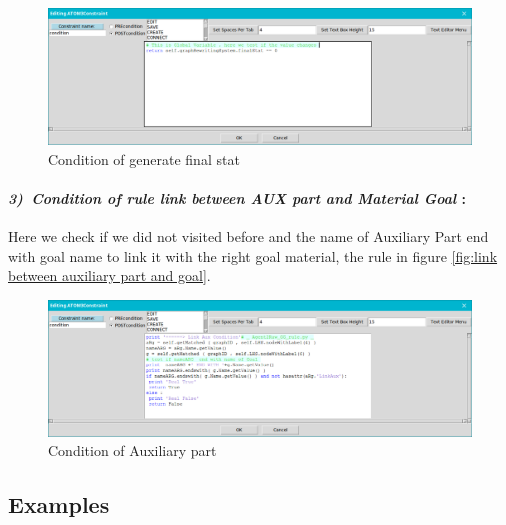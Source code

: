  
\vspace{1cm}
\begin{figure}[th]
	\centering
 	\includegraphics[scale=0.37]{ch3/img/condfinal}
	\caption{\label{fig:Condition of generate final stat } Condition of generate final stat }
\end{figure} 
 

\paragraph{\emph{3)~Condition of rule link between AUX part and Material Goal } : }
Here we check if we did not visited before  and the name of Auxiliary Part end with goal name to link it with the right goal material, the rule in figure \ref{fig:link between auxiliary part and goal}.
 
\vspace{1cm}
 
\begin{figure}[th]
	\centering
 	\includegraphics[scale=0.37]{ch3/img/condaux}
	\caption{\label{fig:Condition of Auxiliary part}Condition of Auxiliary part  }
\end{figure} 
\pagebreak

\subsection{Examples }

